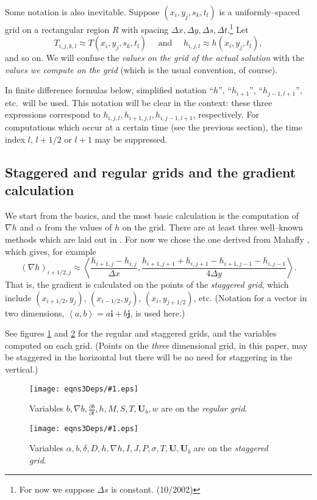 \documentclass{amsart}%
\theoremstyle{plain}
\theoremstyle{definition}
\theoremstyle{remark}
\newcommand{\regfigure}[2]{\texttt{[image: eqns3Deps/\#1.eps]}}
\newcommand{\ddt}[1]{\ensuremath{\frac{\partial #1}{\partial t}}}
\newcommand{\grad}{\nabla}
\newcommand{\ihat}{\mathbf{i}}
\newcommand{\ip}[2]{\ensuremath{\left<#1,#2\right>}}
\newcommand{\jhat}{\mathbf{j}}
\newcommand{\bU}{{\mathbf{U}}}
\begin{document}
Some notation is also inevitable.  Suppose $(x_i,y_j,s_k,t_l)$ is a uniformly--spaced grid on a rectangular region $R$ with spacing $\Delta x,\Delta y, \Delta s,\Delta t$.\footnote{For now we suppose $\Delta s$ is constant.  (10/2002)}  Let
    $$T_{i,j,k,l} \approx T(x_i,y_j,s_k,t_l) \quad \text{ and }\quad h_{i,j,l}\approx h(x_i,y_j,t_l),$$
and so on.  We will confuse the \emph{values on the grid of the actual solution} with the \emph{values we compute on the grid}  (which is the usual convention, of course).

In finite difference formulas below, simplified notation ``$h$'', ``$h_{i+1}$'', ``$h_{j-1,l+1}$'', etc.~will be used.  This notation will be clear in the context: these three expressions correspond to $h_{i,j,l},h_{i+1,j,l},h_{i,j-1,l+1}$, respectively.  For computations which occur at a certain time (see the previous section), the time index $l$, $l+1/2$ or $l+1$ may be suppressed.

\subsection{Staggered and regular grids and the gradient calculation}  We start from the basics, and the most basic calculation is the computation of $\grad h$ and $\alpha$ from the values of $h$ on the grid.  There are at least three well--known methods which are laid out in \cite{HindmarshPayne}.  For now we chose the one derived from Mahaffy \cite{Mahaffy}, which gives, for example
    $$(\grad h)_{i+1/2,j} \approx \ip{\frac{h_{i+1,j}-h_{i,j}}{\Delta x}}{\frac{h_{i+1,j+1}+h_{i,j+1}-h_{i+1,j-1}-h_{i,j-1}}{4\Delta y}}.$$
That is, the gradient is calculated on the points of the \emph{staggered grid}, which include $(x_{i+1/2},y_j)$, $(x_{i-1/2},y_j)$, $(x_i,y_{j+1/2})$, etc.  (Notation for a vector in two dimensions, $\ip{a}{b}=a\ihat+b\jhat$, is used here.)

See figures \ref{regsten} and \ref{stagsten} for the regular and staggered grids, and the variables computed on each grid.  (Points on the \emph{three} dimensional grid, in this paper, may be staggered in the horizontal but there will be no need for staggering in the vertical.)

\begin{figure}[ht]
\regfigure{reggridsten}{2}
\caption{Variables $b, \grad b, \ddt{b}, h, M, S, T, \bU_b, w$ are on the \emph{regular grid}.}
\label{regsten}
\end{figure}

\begin{figure}[ht]
\regfigure{staggridsten}{2}
\vspace{-4mm}
\caption{Variables $\alpha, b, \delta, D, h, \grad h, I, J, P, \sigma, T, \bU, \bU_b$ are on the \emph{staggered grid}.}
\label{stagsten}
\end{figure}
\end{document}

